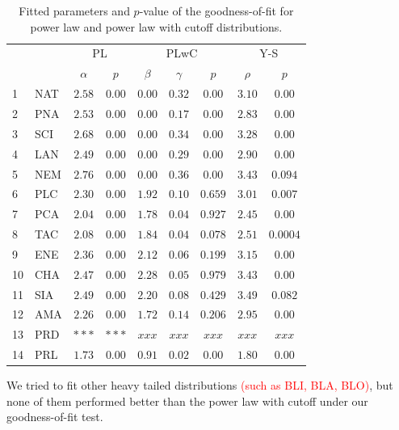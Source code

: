 \documentclass[aps,prl,floatfix,twocolumn]{revtex4-1}
\begin{document}
\begin{table}
 \begin{tabular}{l|l||c|c||c|c|c||c|c}
  && \multicolumn{2}{c||}{PL} & \multicolumn{3}{c||}{PLwC} & \multicolumn{2}{c}{Y-S} \\
  && $\alpha$ & $p$ & $\beta$ & $\gamma$ & $p$ & $\rho$ & $p$ \\
  \hline
  \hline 1 & NAT & $2.58$ & $0.00$ & $0.00$ & $0.32$ & $0.00$ & $3.10$ & $0.00$  \\
  \hline 2 & PNA & $2.53$ & $0.00$ & $0.00$ & $0.17$ & $0.00$ & $2.83$ & $0.00$  \\
  \hline 3 & SCI & $2.68$ & $0.00$ & $0.00$ & $0.34$ & $0.00$ & $3.28$ & $0.00$  \\
  \hline 4 & LAN & $2.49$ & $0.00$ & $0.00$ & $0.29$ & $0.00$ & $2.90$ & $0.00$  \\
  \hline 5 & NEM & $2.76$ & $0.00$ & $0.00$ & $0.36$ & $0.00$ & $3.43$ & $0.094$ \\
  \hline 6 & PLC & $2.30$ & $0.00$ & $1.92$ & $0.10$ & $0.659$ & $3.01$ & $0.007$ \\
  \hline 7 & PCA & $2.04$ & $0.00$ & $1.78$ & $0.04$ & $0.927$ & $2.45$ & $0.00$  \\
  \hline 8 & TAC & $2.08$ & $0.00$ & $1.84$ & $0.04$ & $0.078$ & $2.51$ & $0.0004$ \\
  \hline 9 & ENE & $2.36$ & $0.00$ & $2.12$ & $0.06$ & $0.199$ & $3.15$ & $0.00$  \\
  \hline 10 & CHA & $2.47$ & $0.00$ & $2.28$ & $0.05$ & $0.979$ & $3.43$ & $0.00$  \\
  \hline 11 & SIA & $2.49$ & $0.00$ & $2.20$ & $0.08$ & $0.429$ & $3.49$ & $0.082$ \\
  \hline 12 & AMA & $2.26$ & $0.00$ & $1.72$ & $0.14$ & $0.206$ & $2.95$ & $0.00$  \\
  \hline 13 & PRD & $***$ & $***$ & $xxx$ & $xxx$ & $xxx$ & $xxx$ & $xxx$ \\
  \hline 14 & PRL & $1.73$ & $0.00$ & $0.91$ & $0.02$ & $0.00$ & $1.80$ & $0.00$  
 \end{tabular}
 \caption{Fitted parameters and $p$-value of the goodness-of-fit for power law and power law with cutoff distributions.}
 \label{tab:fit_gof}
\end{table}

We tried to fit other heavy tailed distributions \textcolor{red}{(such as BLI, BLA, BLO)}, but none of them performed better than the power law with cutoff under our goodness-of-fit test. 
\end{document}
